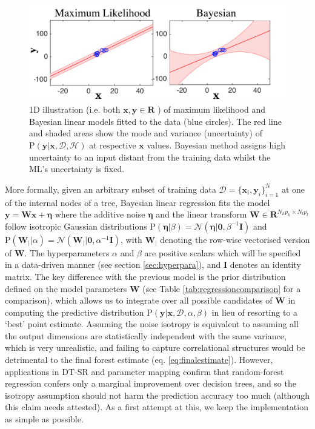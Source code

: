 \begin{figure}
 \centering
\includegraphics[width=11.5 cm]{chapter_2/1dBayLinReg.png}
\caption{1D illustration (i.e. both $\mathbf{x}, \mathbf{y} \in \mathbf{R}$ ) of maximum likelihood and Bayesian linear models fitted to the data (blue circles). The red line and shaded areas show the mode and variance (uncertainty) of $\text{P}(\mathbf{y}|\mathbf{x}, \mathcal{D},\mathcal{H})$ at respective $\mathbf{x}$ values. Bayesian method assigns high uncertainty to an input distant from the training data whilst the ML's uncertainty is fixed.}		\label{fig:sample}
\end{figure}
	
	More formally, given an arbitrary subset of training data $\mathcal{D} = \{\mathbf{x}_i, \mathbf{y}_i\}_{i=1}^{N}$ at one of the internal nodes of a tree, Bayesian linear regression fits the model $\mathbf{y} = \mathbf{W}\mathbf{x} + \boldsymbol{\eta}$ where the additive noise $\boldsymbol{\eta}$ and the linear transform $\mathbf{W} \in \mathbf{R}^{N_hp_h\times N_lp_l}$ follow isotropic Gaussian distributions $\text{P}(\boldsymbol{\eta}| \beta) = \mathcal{N}(\boldsymbol{\eta}|\mathbf{0},\beta^{-1}\mathbf{I})$ 
	and $\text{P}(\mathbf{W}_{|}| \alpha) = \mathcal{N}(\mathbf{W}_{|}|\mathbf{0},\alpha^{-1}\mathbf{I})$, with $\mathbf{W}_{|}$ denoting the row-wise vectorised version of $\mathbf{W}$. The hyperparameters $\alpha$ and $\beta$ are positive scalars which will be specified in a data-driven manner (see section \ref{sec:hyperpara}), and $\mathbf{I}$ denotes an identity matrix. The key difference with the previous model is the prior distribution defined on the model parameters $\mathbf{W}$ (see Table \ref{tab:regressioncomparison} for a comparison), which allows us to integrate over all possible candidates of $\mathbf{W}$ in computing the predictive distribution $\text{P}(\mathbf{y}|\mathbf{x}, \mathcal{D},\alpha,\beta )$ in lieu of resorting to a `best' point estimate. Assuming the noise isotropy is equivalent to assuming all the output dimensions are statistically independent with the same variance, which is very unrealistic, and failing to capture correlational structures would be detrimental to the final forest estimate (eq. \ref{eq:finalestimate}). However, applications in DT-SR and parameter mapping confirm that random-forest regression confers only a marginal improvement over decision trees, and so the isotropy assumption should not harm the prediction accuracy too much (although this claim needs attested). As a first attempt at this, we keep the implementation as simple as possible. 
	
